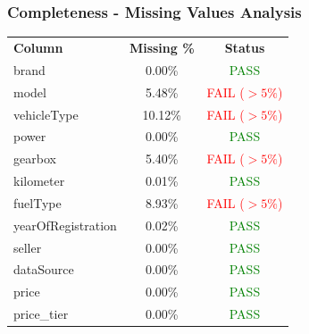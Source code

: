 \documentclass[12pt, a4paper]{article}
\begin{document}
\subsubsection{Completeness - Missing Values Analysis}
\vspace{0.2cm}
\begin{center}
\renewcommand{\arraystretch}{1.4}
\begin{tabular}{l c c}
\rowcolor{slate}
{\color{white}\small\bfseries Column} &
{\color{white}\small\bfseries Missing \%} &
{\color{white}\small\bfseries Status} \\
\rowcolor{lightgray} brand & 0.00\% & \textcolor{green}{PASS} \\
\rowcolor{white} model & 5.48\% & \textcolor{red}{FAIL ($>5\%$)} \\
\rowcolor{lightgray} vehicleType & 10.12\% & \textcolor{red}{FAIL ($>5\%$)} \\
\rowcolor{white} power & 0.00\% & \textcolor{green}{PASS} \\
\rowcolor{lightgray} gearbox & 5.40\% & \textcolor{red}{FAIL ($>5\%$)} \\
\rowcolor{white} kilometer & 0.01\% & \textcolor{green}{PASS} \\
\rowcolor{lightgray} fuelType & 8.93\% & \textcolor{red}{FAIL ($>5\%$)} \\
\rowcolor{white} yearOfRegistration & 0.02\% & \textcolor{green}{PASS} \\
\rowcolor{lightgray} seller & 0.00\% & \textcolor{green}{PASS} \\
\rowcolor{white} dataSource & 0.00\% & \textcolor{green}{PASS} \\
\rowcolor{lightgray} price & 0.00\% & \textcolor{green}{PASS} \\
\rowcolor{white} price\_tier & 0.00\% & \textcolor{green}{PASS} \\
\end{tabular}
\end{center}
\vspace{0.25cm}
\newpage
\end{document}
